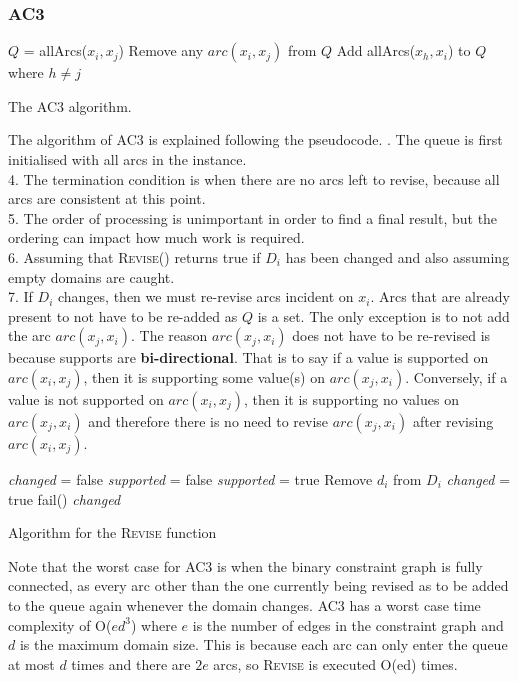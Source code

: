 \documentclass[CS4402-Notes.tex]{subfiles}
\begin{document}
\subsubsection{AC3}
\begin{algorithm}[H]
\begin{algorithmic}[1]
\State $Q$ = allArcs($x_i, x_j$)
    \State Remove any $arc(x_i, x_j)$ from $Q$
        \State Add allArcs($x_h, x_i$) to $Q$ where $h \neq j$
    \EndIf
\EndWhile
\EndFor
\EndProcedure
\end{algorithmic}
\caption{The AC3 algorithm.}
\end{algorithm}
The algorithm of AC3 is explained following the pseudocode.
. The queue is first initialised with all arcs in the instance. \\
4. The termination condition is when there are no arcs left to revise, because all arcs are consistent at this point. \\
5. The order of processing is unimportant in order to find a final result, but the ordering can impact how much work is required. \\
6. Assuming that \textsc{Revise()} returns true if $D_i$ has been changed and also assuming empty domains are caught. \\
7. If $D_i$ changes, then we must re-revise arcs incident on $x_i$. Arcs that are already present to not have to be re-added as $Q$ is a set. The only exception is to not add the arc $arc(x_j,x_i)$.
\n
The reason $arc(x_j,x_i)$ does not have to be re-revised is because supports are \textbf{bi-directional}. That is to say if a value is supported on $arc(x_i,x_j)$, then it is supporting some value(s) on $arc(x_j,x_i)$. Conversely, if a value is not supported on $arc(x_i,x_j)$, then it is supporting no values on $arc(x_j,x_i)$ and therefore there is no need to revise $arc(x_j,x_i)$ after revising $arc(x_i,x_j)$.
\begin{algorithm}[H]
\begin{algorithmic}[1]
\State \textit{changed} = false
\State \textit{supported} = false
  \State \textit{supported} = true
\EndIf
\EndFor
{}
  \State Remove $d_i$ from $D_i$
  \State \textit{changed} = true
\EndIf
\EndFor
{}
  \State fail()
\EndIf
\State \Return \textit{changed}
\EndProcedure
\end{algorithmic}
\caption{Algorithm for the \textsc{Revise} function}
\end{algorithm}
Note that the worst case for AC3 is when the binary constraint graph is fully connected, as every arc other than the one currently being revised as to be added to the queue again whenever the domain changes.
\n
AC3 has a worst case time complexity of O($ed^3$) where $e$ is the number of edges in the constraint graph and $d$ is the maximum domain size. This is because each arc can only enter the queue at most $d$ times and there are $2e$ arcs, so \textsc{Revise} is executed O(ed) times. 
\end{document}
